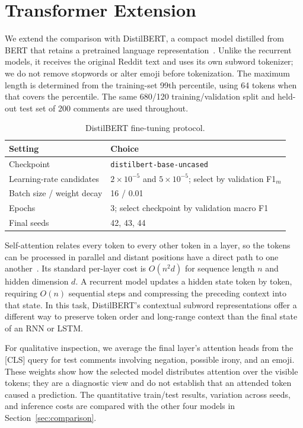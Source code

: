 \section{Transformer Extension}
\label{sec:transformer}

We extend the comparison with DistilBERT, a compact model distilled from BERT
that retains a pretrained language representation~\cite{sanh2019distilbert}.
Unlike the recurrent models, it receives the original Reddit text and uses its
own subword tokenizer; we do not remove stopwords or alter emoji before
tokenization. The maximum length is determined from the training-set 99th
percentile, using 64 tokens when that covers the percentile. The same
680/120 training/validation split and held-out test set of 200 comments are
used throughout.

\begin{table}[t]
\caption{DistilBERT fine-tuning protocol.}
\label{tab:transformer-config}
\centering\footnotesize
\begin{tabular}{@{}p{}p{}@{}}
\toprule
Setting & Choice\\
\midrule
Checkpoint & \texttt{distilbert-base-uncased}\\
Learning-rate candidates & $2\times10^{-5}$ and $5\times10^{-5}$; select by validation F1$_m$\\
Batch size / weight decay & 16 / 0.01\\
Epochs & 3; select checkpoint by validation macro F1\\
Final seeds & 42, 43, 44\\
\bottomrule
\end{tabular}
\end{table}

Self-attention relates every token to every other token in a layer, so the
tokens can be processed in parallel and distant positions have a direct path
to one another~\cite{vaswani2017attention}. Its standard per-layer cost is
$O(n^2d)$ for sequence length $n$ and hidden dimension $d$. A recurrent model
updates a hidden state token by token, requiring $O(n)$ sequential steps and
compressing the preceding context into that state. In this task, DistilBERT's
contextual subword representations offer a different way to preserve token
order and long-range context than the final state of an RNN or LSTM.

For qualitative inspection, we average the final layer's attention heads from
the [CLS] query for test comments involving negation, possible irony, and an
emoji. These weights show how the selected model distributes attention over
the visible tokens; they are a diagnostic view and do not establish that an
attended token caused a prediction. The quantitative train/test results,
variation across seeds, and inference costs are compared with the other four
models in Section~\ref{sec:comparison}.
